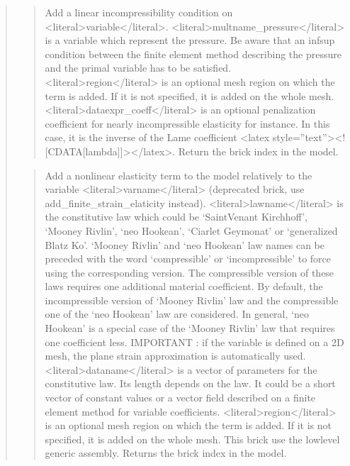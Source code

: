 \documentclass[a4paper,11pt,english]{sphinxmanual}
\begin{document}
\begin{quote}
\begin{quote}
\sphinxAtStartPar
Add a linear incompressibility condition on \textless{}literal\textgreater{}variable\textless{}/literal\textgreater{}. \textless{}literal\textgreater{}multname\_pressure\textless{}/literal\textgreater{}
is a variable which represent the pressure. Be aware that an inf\sphinxhyphen{}sup
condition between the finite element method describing the pressure and the
primal variable has to be satisfied. \textless{}literal\textgreater{}region\textless{}/literal\textgreater{} is an optional mesh region on
which the term is added. If it is not specified, it is added on the whole
mesh. \textless{}literal\textgreater{}dataexpr\_coeff\textless{}/literal\textgreater{} is an optional penalization coefficient for nearly
incompressible elasticity for instance. In this case, it is the inverse
of the Lame coefficient \textless{}latex style=”text”\textgreater{}\textless{}!{[}CDATA{[}lambda{]}{]}\textgreater{}\textless{}/latex\textgreater{}. Return the brick index in the
model.
\end{quote}

\sphinxAtStartPar
{}
\begin{quote}

\sphinxAtStartPar
Add a nonlinear elasticity term to the model relatively to the
variable \textless{}literal\textgreater{}varname\textless{}/literal\textgreater{} (deprecated brick, use add\_finite\_strain\_elaticity
instead). \textless{}literal\textgreater{}lawname\textless{}/literal\textgreater{} is the constitutive law which
could be ‘SaintVenant Kirchhoff’, ‘Mooney Rivlin’, ‘neo Hookean’,
‘Ciarlet Geymonat’ or ‘generalized Blatz Ko’.
‘Mooney Rivlin’ and ‘neo Hookean’ law names can be preceded with the word
‘compressible’ or ‘incompressible’ to force using the corresponding version.
The compressible version of these laws requires one additional material
coefficient. By default, the incompressible version of ‘Mooney Rivlin’ law
and the compressible one of the ‘neo Hookean’ law are considered. In
general, ‘neo Hookean’ is a special case of the ‘Mooney Rivlin’ law that
requires one coefficient less.
IMPORTANT : if the variable is defined on a 2D mesh, the plane strain
approximation is automatically used.
\textless{}literal\textgreater{}dataname\textless{}/literal\textgreater{} is a vector of parameters for the constitutive law. Its length
depends on the law. It could be a short vector of constant values or a
vector field described on a finite element method for variable
coefficients. \textless{}literal\textgreater{}region\textless{}/literal\textgreater{} is an optional mesh region on which the term
is added. If it is not specified, it is added on the whole mesh.
This brick use the low\sphinxhyphen{}level generic assembly.
Returns the brick index in the model.
\end{quote}


\end{quote}
\end{document}
